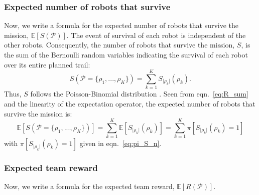 \documentclass[fleqn,10pt,lineno]{wlpeerj}
\begin{document}
\subsubsection{Expected number of robots that survive}
Now, we write a formula for the expected number of robots that survive the mission, $\mathbb{E}[S(\mathcal{P})]$. The event of survival of each robot is independent of the other robots.
Consequently, the number of robots that survive the mission, $S$, is the sum of the Bernoulli random variables indicating the survival of each robot over its entire planned trail:
\begin{equation}
	S(\mathcal{P}=\{\rho_1, ..., \rho_K\})=\sum_{k=1}^K S_{\lvert \rho_k \rvert}(\rho_k). \label{eq:R_sum}
\end{equation}
Thus, $S$ follows the Poisson-Binomial distribution \cite{tang2023poisson}.
Seen from eqn.~\ref{eq:R_sum} and the linearity of the expectation operator, the expected number of robots that survive the mission is:
\begin{equation}
	\mathbb{E}[S(\mathcal{P}=\{\rho_1, ..., \rho_K\})]=\sum_{k=1}^K \mathbb{E}[S_{\lvert \rho_k \rvert}(\rho_k)] = \sum_{k=1}^K  \pi[S_{\lvert \rho_k \rvert}(\rho_k) = 1] \label{eq:formula_obj2}
\end{equation} with $\pi[S_{\lvert \rho_k \rvert}(\rho_k) = 1]$ given in eqn.~\ref{eq:pi_S_n}.

\subsubsection{Expected team reward}
Now, we write a formula for the expected team reward, $\mathbb{E}[R(\mathcal{P})]$. 
\end{document}
